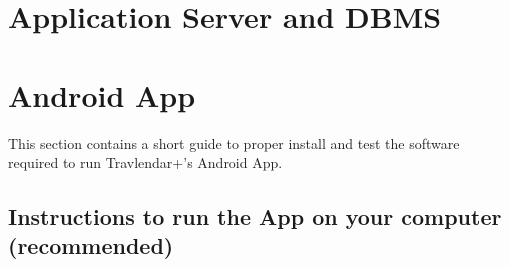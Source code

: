 \section{Application Server and DBMS}
\label{sect:Application Server and DBMS}

\section{Android App}
\label{sect:Android App}
This section contains a short guide to proper install and test the software required to run Travlendar+'s Android App.\\

\subsection{Instructions to run the App on your computer (recommended)}
\label{subsect:Computer Instructions}
